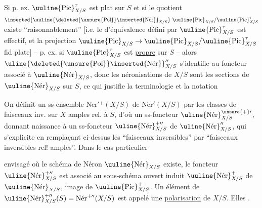 Si p. ex. $\uuline{\operatorname{Pic}}^{\tau}_{X/S}$ est plat sur $S$ et si le quotient $\inserted{\uuline{\deleted{\unsure{\operatorname{Pol}}}\inserted{\operatorname{N\acute{e}r}}}_{X/S}}\ \uuline{\operatorname{Pic}}_{X/S}/\uuline{\operatorname{Pic}}^{\tau}_{X/S}$ existe ``raisonnablement'' [i.e. le   d'équivalence défini par $\uuline{\operatorname{Pic}}^{\tau}_{X/S}$ est effectif, et la projection $\uuline{\operatorname{Pic}}_{X/S}\to\uuline{\operatorname{Pic}}_{X/S}/\uuline{\operatorname{Pic}}^{\tau}_{X/S}$ fid plate] -- p. ex. si $\uuline{\operatorname{Pic}}^{\tau}_{X/S}$ est \uline{propre} sur $S$ -- alors  $\uline{\deleted{\unsure{\operatorname{Pol}}}\inserted{\operatorname{N\acute{e}r}}}''_{X/S}$ s'identifie au foncteur associé à  $\uuline{\operatorname{N\acute{e}r}}_{X/S}$, donc les néronisations de $X/S$ sont les sections de $\uuline{\operatorname{N\acute{e}r}}_{X/S}$ sur $S$, ce qui justifie la terminologie et  la notation


On définit un ss-ensemble $\operatorname{N\acute{e}r}'{}^+(X/S)$ de $\operatorname{N\acute{e}r}'(X/S)$ par les classes de faisceaux inv. sur $X$  amples rel. à $S$, d'où un ss-foncteur $\uline{\operatorname{N\acute{e}r}}^{\unsure{+}\prime}_{X/S}$, donnant naissance à un ss-foncteur $\uline{\operatorname{N\acute{e}r}}^{+\prime\prime}_{X/S}$ de $\uline{\operatorname{N\acute{e}r}}''_{X/S}$, qui s'explicite en remplaçant ci-dessus les ``faisceaux inversibles'' par ``faisceaux inversibles rel! amples''. Dans le cas particulier

envisagé où le schéma de Néron $\uuline{\operatorname{N\acute{e}r}}_{X/S}$ existe, le foncteur $\uline{\operatorname{N\acute{e}r}}^{+\prime\prime}_{X/S}$ est associé au sous-schéma ouvert induit $\uuline{\operatorname{N\acute{e}r}}^{+}_{X/S}$ de $\uuline{\operatorname{N\acute{e}r}}_{X/S}$, image de $\uuline{\operatorname{Pic}}^{+}_{X/S}$. Un élément de $\uline{\operatorname{N\acute{e}r}}^{+\prime\prime}_{X/S}(S)=\operatorname{N\acute{e}r}^{+\prime\prime}(X/S)$ est appelé une \uline{polarisation}  de $X/S$. Elles .

